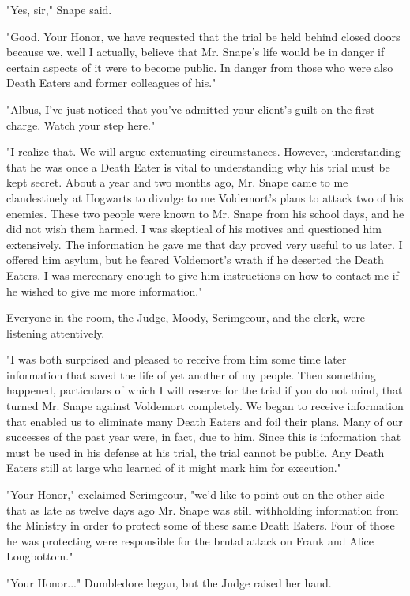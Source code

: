 \documentclass[a4paper,11pt]{article}
\begin{document}
"Yes, sir," Snape said.

"Good. Your Honor, we have requested that the trial be held behind closed doors because we, well I actually, believe that Mr. Snape's life would be in danger if certain aspects of it were to become public. In danger from those who were also Death Eaters and former colleagues of his."

"Albus, I've just noticed that you've admitted your client's guilt on the first charge. Watch your step here."

"I realize that. We will argue extenuating circumstances. However, understanding that he was once a Death Eater is vital to understanding why his trial must be kept secret. About a year and two months ago, Mr. Snape came to me clandestinely at Hogwarts to divulge to me Voldemort's plans to attack two of his enemies. These two people were known to Mr. Snape from his school days, and he did not wish them harmed. I was skeptical of his motives and questioned him extensively. The information he gave me that day proved very useful to us later. I offered him asylum, but he feared Voldemort's wrath if he deserted the Death Eaters. I was mercenary enough to give him instructions on how to contact me if he wished to give me more information."

Everyone in the room, the Judge, Moody, Scrimgeour, and the clerk, were listening attentively.

"I was both surprised and pleased to receive from him some time later information that saved the life of yet another of my people. Then something happened, particulars of which I will reserve for the trial if you do not mind, that turned Mr. Snape against Voldemort completely. We began to receive information that enabled us to eliminate many Death Eaters and foil their plans. Many of our successes of the past year were, in fact, due to him. Since this is information that must be used in his defense at his trial, the trial cannot be public. Any Death Eaters still at large who learned of it might mark him for execution."

"Your Honor," exclaimed Scrimgeour, "we'd like to point out on the other side that as late as twelve days ago Mr. Snape was still withholding information from the Ministry in order to protect some of these same Death Eaters. Four of those he was protecting were responsible for the brutal attack on Frank and Alice Longbottom."

"Your Honor..." Dumbledore began, but the Judge raised her hand.
\end{document}
